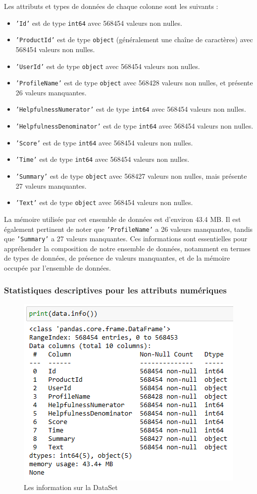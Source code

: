 Les attributs et types de données de chaque colonne sont les suivants :
\begin{itemize}
    \item \texttt{'Id'} est de type \texttt{int64} avec 568454 valeurs non nulles.
    \item \texttt{'ProductId'} est de type \texttt{object} (généralement une chaîne de caractères) avec 568454 valeurs non nulles.
    \item \texttt{'UserId'} est de type \texttt{object} avec 568454 valeurs non nulles.
    \item \texttt{'ProfileName'} est de type \texttt{object} avec 568428 valeurs non nulles, et présente 26 valeurs manquantes.
    \item \texttt{'HelpfulnessNumerator'} est de type \texttt{int64} avec 568454 valeurs non nulles.
    \item \texttt{'HelpfulnessDenominator'} est de type \texttt{int64} avec 568454 valeurs non nulles.
    \item \texttt{'Score'} est de type \texttt{int64} avec 568454 valeurs non nulles.
    \item \texttt{'Time'} est de type \texttt{int64} avec 568454 valeurs non nulles.
    \item \texttt{'Summary'} est de type \texttt{object} avec 568427 valeurs non nulles, mais présente 27 valeurs manquantes.
    \item \texttt{'Text'} est de type \texttt{object} avec 568454 valeurs non nulles.
\end{itemize}

La mémoire utilisée par cet ensemble de données est d'environ 43.4 MB. Il est également pertinent de noter que \texttt{'ProfileName'} a 26 valeurs manquantes, tandis que \texttt{'Summary'} a 27 valeurs manquantes. Ces informations sont essentielles pour appréhender la composition de notre ensemble de données, notamment en termes de types de données, de présence de valeurs manquantes, et de la mémoire occupée par l'ensemble de données.


\subsubsection{Statistiques descriptives pour les attributs numériques}
\begin{figure}[h]
    \centering
    \includegraphics[scale=1]{assets/datainfo.PNG}
    \caption{Les information sur la DataSet}
    \label{fig:dataframeinfo}
\end{figure}
